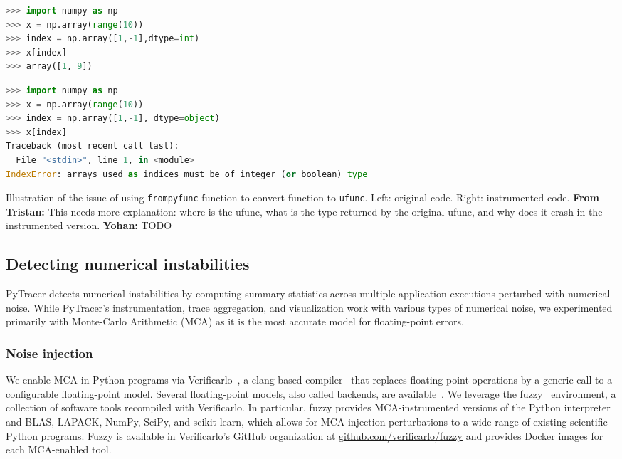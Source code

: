 \documentclass[11pt]{article}
\newcommand{\tristan}[1]{\color{orange}\textbf{From Tristan:} #1\color{black}\xspace}
\newcommand{\Yohan}[1]{\color{green!75!black}\textbf{Yohan:} #1\color{black}\xspace}
\newcommand{\pytracer}[0]{PyTracer\xspace}
\begin{document}
\begin{listing}
\begin{minipage}[t]{0.4\linewidth}
    \begin{lstlisting}[language=Python,style=customPython]
>>> import numpy as np
>>> x = np.array(range(10))
>>> index = np.array([1,-1],dtype=int)
>>> x[index]
>>> array([1, 9])
    \end{lstlisting}
\end{minipage}
\begin{minipage}[t]{0.4\linewidth}
    \begin{lstlisting}[language=Python,style=customPython]
>>> import numpy as np
>>> x = np.array(range(10))
>>> index = np.array([1,-1], dtype=object)
>>> x[index]
Traceback (most recent call last):
  File "<stdin>", line 1, in <module>
IndexError: arrays used as indices must be of integer (or boolean) type
    \end{lstlisting}
\end{minipage}
\caption{Illustration of the issue of using \texttt{frompyfunc} function to convert function to \texttt{ufunc}. Left: original code. Right: instrumented code. 
\tristan{This needs more explanation: where is the ufunc, what is the type returned by the original ufunc, and why does it crash in the instrumented version.} \Yohan{TODO}}
    \label{fig:numpy_array_index_issue}
\end{listing}

\subsection{Detecting numerical instabilities}

\pytracer detects numerical instabilities by computing summary statistics across multiple application executions perturbed with numerical noise. While \pytracer's instrumentation, trace aggregation, and visualization work with various types of numerical noise, we experimented primarily with Monte-Carlo Arithmetic (MCA) as it is the most accurate model for floating-point errors.

\subsubsection{Noise injection}
\label{sec:fuzzy}


We enable MCA in Python programs via Verificarlo~\cite{verificarlo}, a clang-based compiler~\cite{lattner2008llvm} that replaces floating-point operations by a generic call to a configurable floating-point model. Several floating-point models, also called backends, are available~\cite{chatelain2019automatic,chatelain2019outils}.
We leverage the fuzzy~\cite{kiar2020comparing} environment, a collection of software tools recompiled with Verificarlo. In particular, fuzzy provides MCA-instrumented versions of the Python interpreter and BLAS, LAPACK, NumPy, SciPy, and scikit-learn, which allows for MCA injection perturbations to a wide range of existing scientific Python programs. Fuzzy is available in Verificarlo's GitHub organization at \href{https://github.com/verificarlo/fuzzy}{\url{github.com/verificarlo/fuzzy}} and provides Docker images for each MCA-enabled tool.
\end{document}
